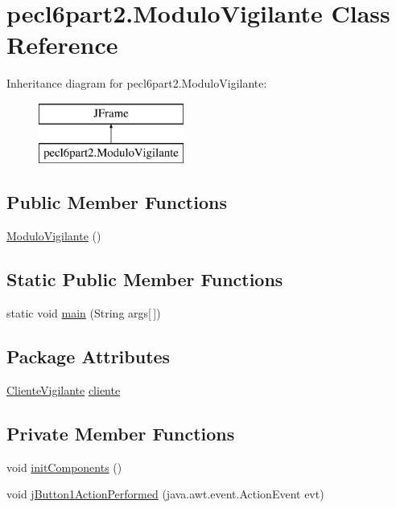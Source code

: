 \hypertarget{classpecl6part2_1_1_modulo_vigilante}{}\section{pecl6part2.\+Modulo\+Vigilante Class Reference}
\label{classpecl6part2_1_1_modulo_vigilante}
Inheritance diagram for pecl6part2.\+Modulo\+Vigilante\+:\begin{figure}[H]
\begin{center}
\leavevmode
\includegraphics[height=2.000000cm]{classpecl6part2_1_1_modulo_vigilante}
\end{center}
\end{figure}
\subsection*{Public Member Functions}
\begin{DoxyCompactItemize}
\item 
\mbox{\hyperlink{classpecl6part2_1_1_modulo_vigilante_a1ae677df7d37e3ef8303a33e80513d0f}{Modulo\+Vigilante}} ()
\end{DoxyCompactItemize}
\subsection*{Static Public Member Functions}
\begin{DoxyCompactItemize}
\item 
static void \mbox{\hyperlink{classpecl6part2_1_1_modulo_vigilante_aee9b63050996c952ce471075bfbc9e60}{main}} (String args\mbox{[}$\,$\mbox{]})
\end{DoxyCompactItemize}
\subsection*{Package Attributes}
\begin{DoxyCompactItemize}
\item 
\mbox{\hyperlink{classpecl6part2_1_1_cliente_vigilante}{Cliente\+Vigilante}} \mbox{\hyperlink{classpecl6part2_1_1_modulo_vigilante_a1eeb1ecf2825987aa4aee43982b788e7}{cliente}}
\end{DoxyCompactItemize}
\subsection*{Private Member Functions}
\begin{DoxyCompactItemize}
\item 
void \mbox{\hyperlink{classpecl6part2_1_1_modulo_vigilante_abf15a8aaafb98122919094a798f7455d}{init\+Components}} ()
\item 
void \mbox{\hyperlink{classpecl6part2_1_1_modulo_vigilante_acfd165e42bad1854ee98d3740a9f4ffa}{j\+Button1\+Action\+Performed}} (java.\+awt.\+event.\+Action\+Event evt)
\end{DoxyCompactItemize}
